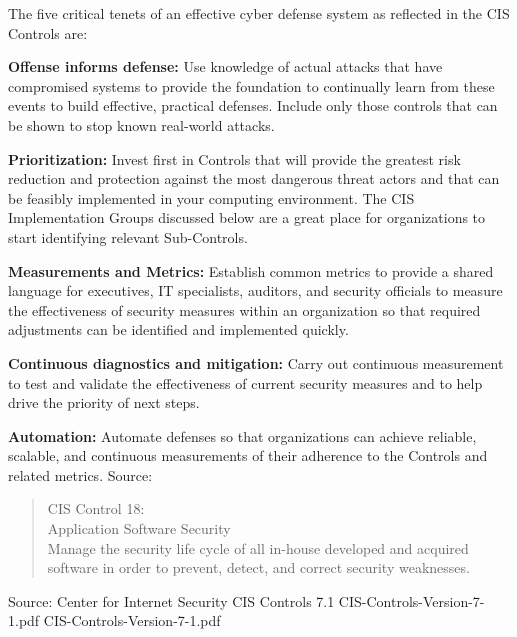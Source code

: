 \documentclass[Screen16to9,17pt]{foils}
\begin{document}
\begin{list2}
\item
The five critical tenets of an effective cyber defense system as reflected
in the CIS Controls are:
\item {\bf Offense informs defense:} Use knowledge of actual attacks that have
compromised systems to provide the foundation to continually learn
from these events to build effective, practical defenses. Include only
those controls that can be shown to stop known real-world attacks.
\item {\bf Prioritization:} Invest first in Controls that will provide the greatest risk
reduction and protection against the most dangerous threat actors
and that can be feasibly implemented in your computing environment.
The CIS Implementation Groups discussed below are a great place for
organizations to start identifying relevant Sub-Controls.
\item {\bf Measurements and Metrics:} Establish common metrics to provide a
shared language for executives, IT specialists, auditors, and security
officials to measure the effectiveness of security measures within
an organization so that required adjustments can be identified and
implemented quickly.
\item {\bf Continuous diagnostics and mitigation:} Carry out continuous
measurement to test and validate the effectiveness of current security
measures and to help drive the priority of next steps.
\item {\bf Automation:} Automate defenses so that organizations can achieve
reliable, scalable, and continuous measurements of their adherence to
the Controls and related metrics. \hskip 2cm Source:

\begin{quote}
CIS Control 18:\\
Application Software Security\\
Manage the security life cycle of all in-house developed and acquired software in order to prevent, detect, and correct security weaknesses.
\end{quote}

\begin{list1}
\item
\item
\item
\item
\end{list1}

Source: Center for Internet Security CIS Controls 7.1 CIS-Controls-Version-7-1.pdf
 CIS-Controls-Version-7-1.pdf
\end{list2}
\end{document}
